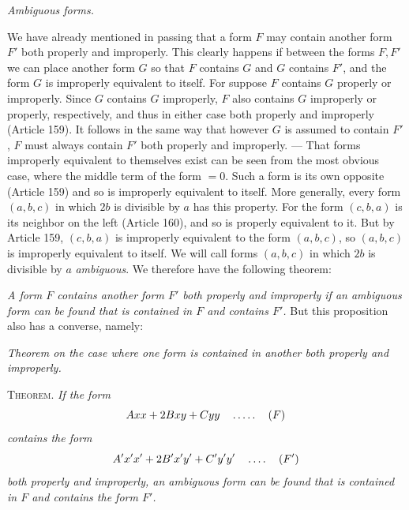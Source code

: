 \begin{center}
\textit{Ambiguous forms.}
\end{center}
We have already mentioned in passing that a form $F$ may contain another form $F'$ both properly and improperly. This clearly happens if between the forms $F,F'$ we can place another form $G$ so that $F$ contains $G$ and $G$ contains $F'$, and the form $G$ is improperly equivalent to itself. For suppose $F$ contains $G$ properly or improperly. Since $G$ contains $G$ improperly, $F$ also contains $G$ improperly or properly, respectively, and thus in either case both properly and improperly (Article 159). It follows in the same way that however $G$ is assumed to contain $F'$, $F$ must always contain $F'$ both properly and improperly. --- That forms improperly equivalent to themselves exist can be seen from the most obvious case, where the middle term of the form $=0$. Such a form is its own opposite (Article 159) and so is improperly equivalent to itself. More generally, every form $(a,b,c)$ in which $2b$ is divisible by $a$ has this property. For the form $(c,b,a)$ is its neighbor on the left (Article 160), and so is properly equivalent to it. But by Article 159, $(c,b,a)$ is improperly equivalent to the form $(a,b,c)$, so $(a,b,c)$ is improperly equivalent to itself. We will call forms $(a,b,c)$ in which $2b$ is divisible by $a$ \textit{ambiguous}. We therefore have the following theorem:

\textit{A form $F$ contains another form $F'$ both properly and improperly if an ambiguous form can be found that is contained in $F$ and contains $F'$.} But this proposition also has a converse, namely:

\begin{center}
\textit{Theorem on the case where one form is contained in another both properly and improperly.}
\end{center}
\textsc{Theorem.} \textit{If the form}
\[
Axx+2Bxy+Cyy\quad\mathinner{.\,.\,.\,.\,.}\quad(F)
\]
\textit{contains the form}
\[
A'x'x'+2B'x'y'+C'y'y'\quad\mathinner{.\,.\,.\,.}\quad(F')
\]
\textit{both properly and improperly, an ambiguous form can be found that is contained in $F$ and contains the form $F'$.}

